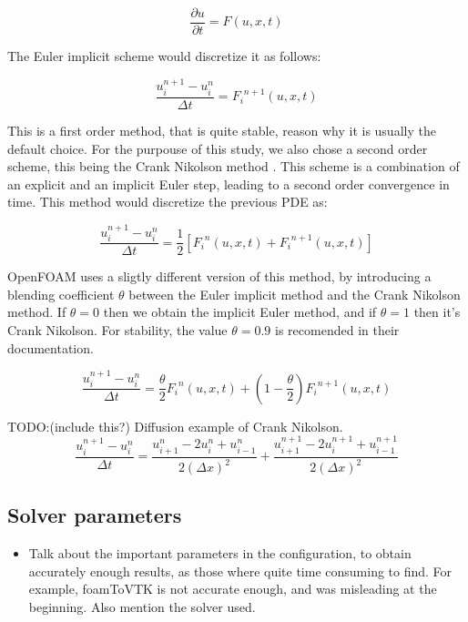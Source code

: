 \documentclass[
  english,        %
  font=times,     %
  onecolumn,      %
]{tumarticle}
\begin{document}
\begin{equation}
    \frac{\partial u}{\partial t} = F(u, x, t)
\end{equation}

The Euler implicit scheme would discretize it as follows:

\begin{equation}
    \frac{u_i^{n+1} - u_i^n}{\Delta t} = {F_i}^{n+1}(u, x, t)
\end{equation}

This is a first order method, that is quite stable, reason why it is usually the default choice. For the purpouse of this study, we also chose a second order scheme, this being the Crank Nikolson method \cite{crank1947practical}. This scheme is a combination of an explicit and an implicit Euler step, leading to a second order convergence in time. This method would discretize the previous PDE as: 

\begin{equation}
    \frac{u_i^{n+1} - u_i^n}{\Delta t} = \frac{1}{2} \left[{F_i}^{n}(u, x, t) +  {F_i}^{n+1}(u, x, t) \right]
\end{equation}


OpenFOAM uses a sligtly different version of this method, by introducing a blending coefficient $\theta$ between the Euler implicit method and the Crank Nikolson method. If $\theta = 0$ then we obtain the implicit Euler method, and if $\theta = 1$ then it's Crank Nikolson. For stability, the value $\theta = 0.9$ is recomended in their documentation.

\begin{equation}
    \frac{u_i^{n+1} - u_i^n}{\Delta t} = \frac{\theta}{2} {F_i}^{n}(u, x, t) + \left( 1 - \frac{\theta}{2} \right) {F_i}^{n+1}(u, x, t)
\end{equation}

 TODO:(include this?) Diffusion example of Crank Nikolson.
\begin{equation}
    \frac{u_i^{n+1} - u_i^{n}}{\Delta t} = \frac{u_{i + 1}^{n} - 2u_{i}^{n} + u_{i - 1}^{n}}{2 \left( \Delta x \right)^2} +  \frac{u_{i + 1}^{n + 1} - 2u_{i}^{n + 1} + u_{i - 1}^{n + 1}}{2 \left( \Delta x \right)^2}
\end{equation}


\subsection{Solver parameters}
\begin{itemize}
    \item Talk about the important parameters in the configuration, to obtain accurately enough results, as those where quite time consuming to find. For example, foamToVTK is not accurate enough, and was misleading at the beginning. Also mention the solver used.
\end{itemize}
\end{document}
